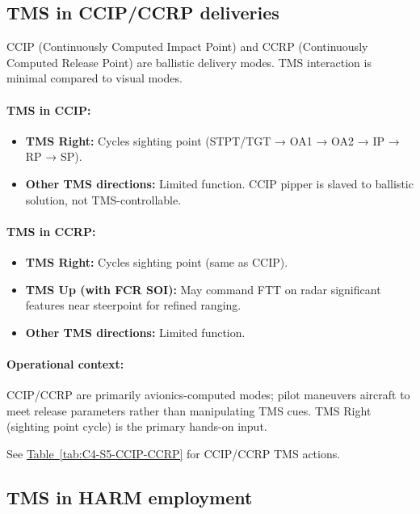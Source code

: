 \documentclass[11pt, a4paper, twoside]{report}
\newcommand{\tabref}[1]{\hyperref[#1]{Table~\ref*{#1}}}
\begin{document}
\subsection{TMS in CCIP/CCRP deliveries}
\label{sec:C3-S5-S4}

CCIP (Continuously Computed Impact Point) and CCRP (Continuously Computed Release Point) are ballistic delivery modes. TMS interaction is minimal compared to visual modes.

\paragraph{TMS in CCIP:}
\begin{itemize}
    \item \textbf{TMS Right:} Cycles sighting point (STPT/TGT → OA1 → OA2 → IP → RP → SP).
    \item \textbf{Other TMS directions:} Limited function. CCIP pipper is slaved to ballistic solution, not TMS-controllable.
\end{itemize}

\paragraph{TMS in CCRP:}
\begin{itemize}
    \item \textbf{TMS Right:} Cycles sighting point (same as CCIP).
    \item \textbf{TMS Up (with FCR SOI):} May command FTT on radar significant features near steerpoint for refined ranging.
    \item \textbf{Other TMS directions:} Limited function.
\end{itemize}

\paragraph{Operational context:}
CCIP/CCRP are primarily avionics-computed modes; pilot maneuvers aircraft to meet release parameters rather than manipulating TMS cues. TMS Right (sighting point cycle) is the primary hands-on input.

See \tabref{tab:C4-S5-CCIP-CCRP} for CCIP/CCRP TMS actions.

\subsection{TMS in HARM employment}
\label{sec:C4-S5-S5}
\end{document}

